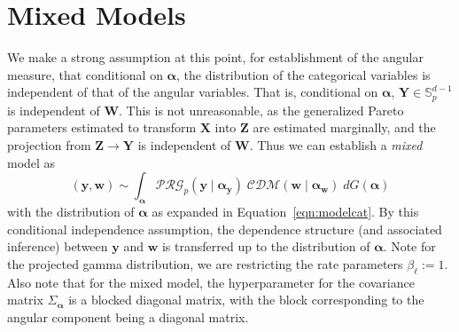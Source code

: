 \section{Mixed Models}
We make a strong assumption at this point, for establishment of the angular 
  measure, that conditional on $\bm{\alpha}$, the distribution of the categorical 
  variables is independent of that of the angular variables.  That is, conditional
  on $\bm{\alpha}$, $\bm{Y} \in {\mathbb S}_{p}^{d-1}$ is independent of $\bm{W}$.  
  This is not unreasonable, as the generalized Pareto parameters estimated to transform 
  $\bm{X}$ into $\bm{Z}$ are estimated marginally, and the projection from
  $\bm{Z}\to\bm{Y}$ is independent of $\bm{W}$.  Thus we can establish a 
  \emph{mixed} model as
  \begin{equation}
    \label{model:mixed}
    (\bm{y},\bm{w})\sim \int_{\bm{\alpha}}\mathcal{PRG}_{p}(\bm{y}\mid\bm{\alpha}_{\bm{y}})
    \;\mathcal{CDM}(\bm{w}\mid\bm{\alpha}_{\bm{w}})\;dG(\bm{\alpha})
  \end{equation}
  with the distribution of $\bm{\alpha}$ as expanded in Equation~\ref{eqn:modelcat}.
    By this conditional independence assumption, the dependence structure 
    (and associated inference) between  $\bm{y}$ and $\bm{w}$ is transferred up 
    to the distribution of $\bm{\alpha}$.  Note for the projected gamma distribution, 
    we are restricting the rate parameters $\beta_{\ell} := 1$.  Also note that for the 
    mixed model, the hyperparameter for the covariance matrix $\Sigma_{\bm{\alpha}}$
    is a blocked diagonal matrix, with the block corresponding to the angular component
    being a diagonal matrix.

